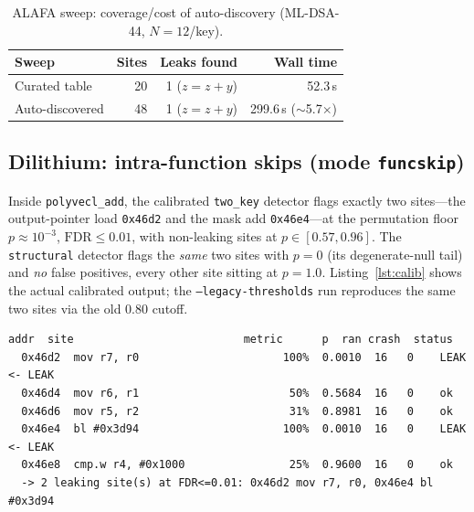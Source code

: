 \documentclass[11pt]{article}
\newcommand{\code}[1]{\texttt{#1}}
\begin{document}
\begin{table}[h]
\centering\small
\caption{ALAFA sweep: coverage/cost of auto-discovery (ML-DSA-44, $N{=}12$/key).}
\label{tab:alafa}
\begin{tabular}{@{}lrrr@{}}
\toprule
Sweep & Sites & Leaks found & Wall time \\
\midrule
Curated table    & 20 & 1 ($z{=}z{+}y$) & 52.3\,s \\
Auto-discovered  & 48 & 1 ($z{=}z{+}y$) & 299.6\,s ($\sim$5.7$\times$) \\
\bottomrule
\end{tabular}
\end{table}

\subsection{Dilithium: intra-function skips (mode \code{funcskip})}
Inside \code{polyvecl\_add}, the calibrated \code{two\_key} detector flags exactly
two sites---the output-pointer load \code{0x46d2} and the mask add \code{0x46e4}---at
the permutation floor $p\approx 10^{-3}$, $\text{FDR}\le0.01$, with non-leaking sites
at $p\in[0.57,0.96]$. The \code{structural} detector flags the \emph{same} two sites
with $p=0$ (its degenerate-null tail) and \emph{no} false positives, every other
site sitting at $p=1.0$. Listing~\ref{lst:calib} shows the actual calibrated output;
the \code{--legacy-thresholds} run reproduces the same two sites via the old
$0.80$ cutoff.

\begin{lstlisting}[style=out,caption={Calibrated \code{funcskip} on ML-DSA-44
(\code{two\_key}). The p column and the FDR-based footer are the calibrated
verdict.},label={lst:calib}]
   addr  site                          metric      p  ran crash  status
  0x46d2  mov r7, r0                      100%  0.0010  16   0    LEAK  <- LEAK
  0x46d4  mov r6, r1                       50%  0.5684  16   0    ok
  0x46d6  mov r5, r2                       31%  0.8981  16   0    ok
  0x46e4  bl #0x3d94                      100%  0.0010  16   0    LEAK  <- LEAK
  0x46e8  cmp.w r4, #0x1000                25%  0.9600  16   0    ok
  -> 2 leaking site(s) at FDR<=0.01: 0x46d2 mov r7, r0, 0x46e4 bl #0x3d94
\end{lstlisting}
\end{document}
